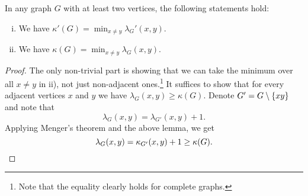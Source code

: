 \begin{izrek}[Menger]
In any graph $G$ with at least two vertices, the following
statements hold:

\begin{enumerate}[i)]
\item We have
$\kappa'(G) = \displaystyle \min_{x \ne y} \lambda_G'(x,y)$.
\item We have
$\kappa(G) = \displaystyle \min_{x \ne y} \lambda_G(x,y)$.
\end{enumerate}
\end{izrek}

\begin{proof}
The only non-trivial part is showing that we can take the minimum
over all $x \ne y$ in ii), not just non-adjacent
ones.\footnote{Note that the equality clearly holds for complete
graphs.} It suffices to show that for every adjacent vertices $x$
and $y$ we have $\lambda_G(x,y) \geq \kappa(G)$. Denote
$G' = G \setminus \left\{xy\right\}$ and note that
\[
\lambda_G(x,y) = \lambda_{G'}(x,y) + 1.
\]
Applying Menger's theorem and the above lemma, we get
\[
\lambda_G(x,y) = \kappa_{G'}(x,y) + 1 \geq \kappa(G). \qedhere
\]
\end{proof}
